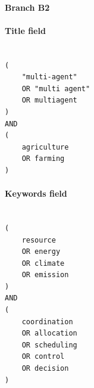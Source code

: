 \paragraph{Branch B2}

\paragraph{Title field}

\begin{lstlisting}

(
    "multi-agent"
    OR "multi agent"
    OR multiagent
)
AND
(
    agriculture
    OR farming
)

\end{lstlisting}

\paragraph{Keywords field}

\begin{lstlisting}

(
    resource
    OR energy
    OR climate
    OR emission
)
AND
(
    coordination
    OR allocation
    OR scheduling
    OR control
    OR decision
)

\end{lstlisting}
